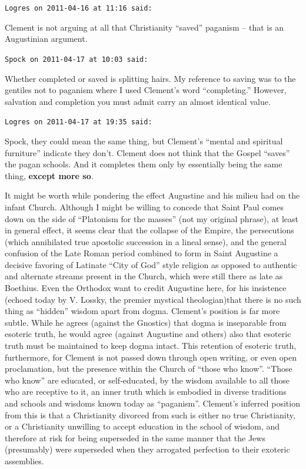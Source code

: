 \begin{footnotesize}
\begin{sffamily}

\texttt{Logres on 2011-04-16 at 11:16 said:}

Clement is not arguing at all that Christianity ``saved'' paganism -- that is an Augustinian argument.

\hfill

\texttt{Spock on 2011-04-17 at 10:03 said:}

Whether completed or saved is splitting hairs. My reference to saving was to the gentiles not to paganism where I used Clement's word ``completing.'' However, salvation and completion you must admit carry an almost identical value.

\hfill

\texttt{Logres on 2011-04-17 at 19:35 said:}

Spock, they could mean the same thing, but Clement's ``mental and spiritual furniture'' indicate they don't. Clement does not think that the Gospel ``saves'' the pagan schools. And it completes them only by essentially being the same thing, \textbf{except more so}.

It might be worth while pondering the effect Augustine and his milieu had on the infant Church. Although I might be willing to concede that Saint Paul comes down on the side of ``Platonism for the masses'' (not my original phrase), at least in general effect, it seems clear that the collapse of the Empire, the persecutions (which annihilated true apostolic succession in a lineal sense), and the general confusion of the Late Roman period combined to form in Saint Augustine a decisive favoring of Latinate ``City of God'' style religion as opposed to authentic and alternate streams present in the Church, which were still there as late as Boethius. Even the Orthodox want to credit Augustine here, for his insistence (echoed today by V. Lossky, the premier mystical theologian)that there is no such thing as ``hidden'' wisdom apart from dogma. Clement's position is far more subtle. While he agrees (against the Gnostics) that dogma is inseparable from esoteric truth, he would agree (against Augustine and others) also that esoteric truth must be maintained to keep dogma intact. This retention of esoteric truth, furthermore, for Clement is not passed down through open writing, or even open proclamation, but the presence within the Church of ``those who know''. ``Those who know'' are educated, or self-educated, by the wisdom available to all those who are receptive to it, an inner truth which is embodied in diverse traditions and schools and wisdoms known today as ``paganism''. Clement's inferred position from this is that a Christianity divorced from such is either no true Christianity, or a Christianity unwilling to accept education in the school of wisdom, and therefore at risk for being superseded in the same manner that the Jews (presumably) were superseded when they arrogated perfection to their exoteric assemblies.


\end{sffamily}
\end{footnotesize}
